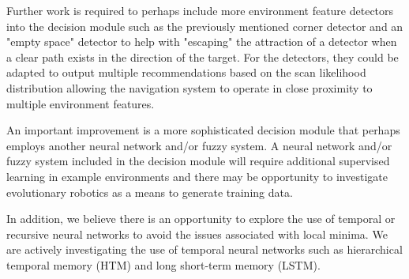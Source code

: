 \documentclass[journal]{IEEEtran}
\begin{document}
Further work is required to perhaps include more environment feature detectors into the decision module such as the previously mentioned corner detector
and an "empty space" detector to help with "escaping" the attraction of a detector when a clear path exists in the direction of the target.
For the detectors, they could be adapted to output multiple recommendations based on the scan likelihood distribution allowing the navigation system
to operate in close proximity to multiple environment features.
 
An important improvement is a more sophisticated decision module that perhaps employs
another neural network and/or fuzzy system.
A neural network and/or fuzzy system included in the decision module will require additional supervised learning in example environments and
there may be opportunity to investigate evolutionary robotics as a means to generate training data.

In addition, we believe there is an opportunity to explore the use of temporal or recursive neural networks to avoid the issues associated with local minima.
We are actively investigating the use of temporal neural networks such as hierarchical temporal memory (HTM) and long short-term memory (LSTM).



%
%

\end{document}
